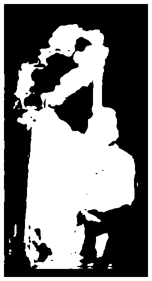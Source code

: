 \begin{figure}[h]
\begin{subfigure}[b]{0.18\textwidth}
         \includegraphics[width=\textwidth]{images/results/base/lighting_fire_skinny_115.png}
     \end{subfigure}
    \hfill
     \begin{subfigure}[b]{0.18\textwidth}
         \centering

\end{subfigure}
\end{figure}
